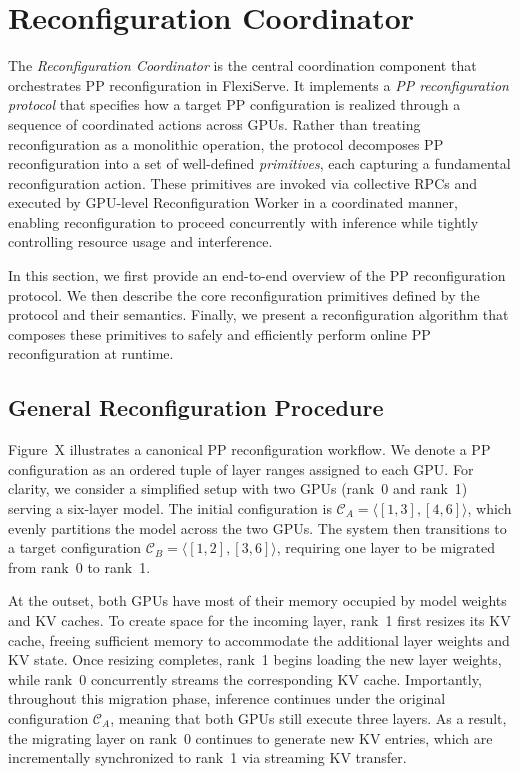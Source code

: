 \documentclass[sigplan,screen]{acmart}
\begin{document}
\section{Reconfiguration Coordinator}

The \emph{Reconfiguration Coordinator} is the central coordination component that orchestrates PP reconfiguration in FlexiServe. It implements a \emph{PP reconfiguration protocol} that specifies how a target PP configuration is realized through a sequence of coordinated actions across GPUs. Rather than treating reconfiguration as a monolithic operation, the protocol decomposes PP reconfiguration into a set of well-defined \emph{primitives}, each capturing a fundamental reconfiguration action. These primitives are invoked via collective RPCs and executed by GPU-level Reconfiguration Worker in a coordinated manner, enabling reconfiguration to proceed concurrently with inference while tightly controlling resource usage and interference.

In this section, we first provide an end-to-end overview of the PP reconfiguration protocol. We then describe the core reconfiguration primitives defined by the protocol and their semantics. Finally, we present a reconfiguration algorithm that composes these primitives to safely and efficiently perform online PP reconfiguration at runtime.


\subsection{General Reconfiguration Procedure}
Figure~X illustrates a canonical PP reconfiguration workflow. We denote a PP configuration as an ordered tuple of layer ranges assigned to each GPU. For clarity, we consider a simplified setup with two GPUs (rank~0 and rank~1) serving a six-layer model. The initial configuration is $\mathcal{C}_A = \langle [1,3], [4,6] \rangle$, which evenly partitions the model across the two GPUs. The system then transitions to a target configuration $\mathcal{C}_B = \langle [1,2], [3,6] \rangle$, requiring one layer to be migrated from rank~0 to rank~1.

At the outset, both GPUs have most of their memory occupied by model weights and KV caches. To create space for the incoming layer, rank~1 first resizes its KV cache, freeing sufficient memory to accommodate the additional layer weights and KV state. Once resizing completes, rank~1 begins loading the new layer weights, while rank~0 concurrently streams the corresponding KV cache. Importantly, throughout this migration phase, inference continues under the original configuration $\mathcal{C}_A$, meaning that both GPUs still execute three layers. As a result, the migrating layer on rank~0 continues to generate new KV entries, which are incrementally synchronized to rank~1 via streaming KV transfer.
\end{document}
